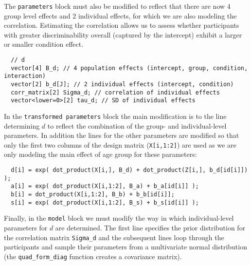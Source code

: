\documentclass[
  english,
  ,man,floatsintext]{apa6}
\newenvironment{Shaded}{\begin{snugshade}}{\end{snugshade}}
\newcommand{\DataTypeTok}[1]{\textcolor[rgb]{0.13,0.29,0.53}{#1}}
\newcommand{\DecValTok}[1]{\textcolor[rgb]{0.00,0.00,0.81}{#1}}
\newcommand{\KeywordTok}[1]{\textcolor[rgb]{0.13,0.29,0.53}{\textbf{#1}}}
\newcommand{\NormalTok}[1]{#1}
\newcommand{\OperatorTok}[1]{\textcolor[rgb]{0.81,0.36,0.00}{\textbf{#1}}}
\newcommand{\StringTok}[1]{\textcolor[rgb]{0.31,0.60,0.02}{#1}}
\begin{document}
\begin{Shaded}
\end{Shaded}

The \texttt{parameters} block must also be modified to reflect that there are now 4 group level effects and 2 individual effects, for which we are also modeling the correlation. Estimating the correlation allows us to assess whether participants with greater discriminability overall (captured by the intercept) exhibit a larger or smaller condition effect.

\begin{verbatim}
  // d
  vector[4] B_d; // 4 population effects (intercept, group, condition, interaction)
  vector[2] b_d[J]; // 2 individual effects (intercept, condition)
  corr_matrix[2] Sigma_d; // correlation of individual effects
  vector<lower=0>[2] tau_d; // SD of individual effects
\end{verbatim}

In the \texttt{transformed\ parameters} block the main modification is to the line determining \(d\) to reflect the combination of the group- and individual-level parameters. In addition the lines for the other parameters are modified so that only the first two columns of the design matrix (\texttt{X{[}i,1:2{]}}) are used as we are only modeling the main effect of age group for these parameters:

\begin{verbatim}
  d[i] = exp( dot_product(X[i,], B_d) + dot_product(Z[i,], b_d[id[i]]) );
  a[i] = exp( dot_product(X[i,1:2], B_a) + b_a[id[i]] );
  b[i] = dot_product(X[i,1:2], B_b) + b_b[id[i]];
  s[i] = exp( dot_product(X[i,1:2], B_s) + b_s[id[i]] );
\end{verbatim}

Finally, in the \texttt{model} block we must modify the way in which individual-level parameters for \(d\) are determined. The first line specifies the prior distribution for the correlation matrix \texttt{Sigma\_d} and the subsequent lines loop through the participants and sample their parameters from a multivariate normal distribution (the \texttt{quad\_form\_diag} function creates a covariance matrix).
\end{document}
